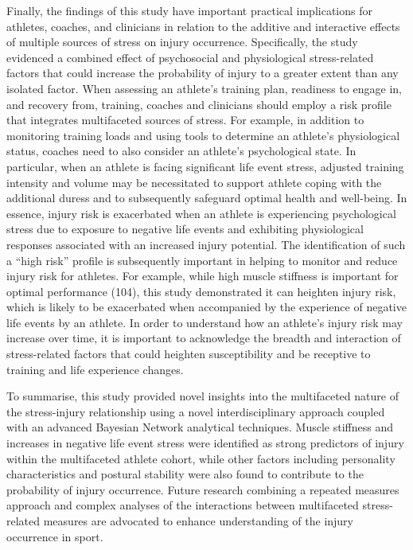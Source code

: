\documentclass[
  english,
  man]{apa6}
\begin{document}
Finally, the findings of this study have important practical implications for athletes, coaches, and clinicians in relation to the additive and interactive effects of multiple sources of stress on injury occurrence.
Specifically, the study evidenced a combined effect of psychosocial and physiological stress-related factors that could increase the probability of injury to a greater extent than any isolated factor.
When assessing an athlete's training plan, readiness to engage in, and recovery from, training, coaches and clinicians should employ a risk profile that integrates multifaceted sources of stress.
For example, in addition to monitoring training loads and using tools to determine an athlete's physiological status, coaches need to also consider an athlete's psychological state.
In particular, when an athlete is facing significant life event stress, adjusted training intensity and volume may be necessitated to support athlete coping with the additional duress and to subsequently safeguard optimal health and well-being.
In essence, injury risk is exacerbated when an athlete is experiencing psychological stress due to exposure to negative life events and exhibiting physiological responses associated with an increased injury potential.
The identification of such a ``high risk'' profile is subsequently important in helping to monitor and reduce injury risk for athletes.
For example, while high muscle stiffness is important for optimal performance (104), this study demonstrated it can heighten injury risk, which is likely to be exacerbated when accompanied by the experience of negative life events by an athlete.
In order to understand how an athlete's injury risk may increase over time, it is important to acknowledge the breadth and interaction of stress-related factors that could heighten susceptibility and be receptive to training and life experience changes.

To summarise, this study provided novel insights into the multifaceted nature of the stress-injury relationship using a novel interdisciplinary approach coupled with an advanced Bayesian Network analytical techniques.
Muscle stiffness and increases in negative life event stress were identified as strong predictors of injury within the multifaceted athlete cohort, while other factors including personality characteristics and postural stability were also found to contribute to the probability of injury occurrence.
Future research combining a repeated measures approach and complex analyses of the interactions between multifaceted stress-related measures are advocated to enhance understanding of the injury occurrence in sport.
\end{document}
